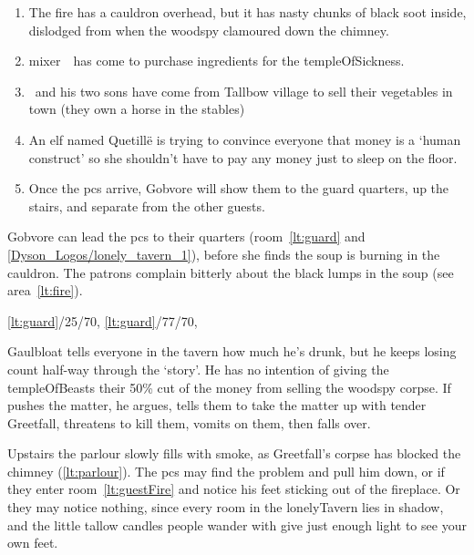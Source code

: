 \documentclass[10pt,twoside]{book}
\begin{document}

\begin{enumerate}\itemsep0em\setcounter{enumi}{\value{diceNo}}
  \item
  The fire has a cauldron overhead, but it has nasty chunks of black soot inside, dislodged from when the \gls{woodspy} clamoured down the chimney.
  \label{lt:fire}
  \item
  \Gls{mixer}~\composeHumanName\ has come to purchase \glspl{ingredient} for the \gls{templeOfSickness}.
  \label{lt:mixer}
  \item
  \composeHumanName\ and his two sons have come from Tallbow \gls{village} to sell their vegetables in town (they own a horse in the stables)
  \label{lt:farmer}
  \item
  An elf named Quetill\"e is trying to convince everyone that money is a `human construct' so she shouldn't have to pay any money just to sleep on the floor.
  \label{lt:elf}
  \item
  Once the \glspl{pc} arrive, Gobvore will show them to the \gls{guard} quarters, up the stairs, and separate from the other guests.
  \label{lt:guard}
\end{enumerate}

Gobvore can lead the \glspl{pc} to their quarters (room~\ref{lt:guard}  and \ref{Dyson_Logos/lonely_tavern_1}), before she finds the soup is burning in the cauldron.
The patrons complain bitterly about the black lumps in the soup (see area~\vref{lt:fire}).

%
  {%
    \ref{lt:guard}/25/70,
    \ref{lt:guard}/77/70,
  }%
  {}

Gaulbloat tells everyone in the tavern how much he's drunk, but he keeps losing count half-way through the `story'.
He has no intention of giving the \gls{templeOfBeasts} their 50\% cut of the money from selling the \gls{woodspy} corpse.
If  pushes the matter, he argues, tells them to take the matter up with \gls{tender} Greetfall, threatens to kill them, vomits on them, then falls over.

Upstairs the parlour slowly fills with smoke, as Greetfall's corpse has blocked the chimney (\vref{lt:parlour}).
The \glspl{pc} may find the problem and pull him down, or if they enter room~\vref{lt:guestFire} and notice his feet sticking out of the fireplace.
Or they may notice nothing, since every room in the \gls{lonelyTavern} lies in shadow, and the little tallow candles people wander with give just enough light to see your own feet.
\end{document}
